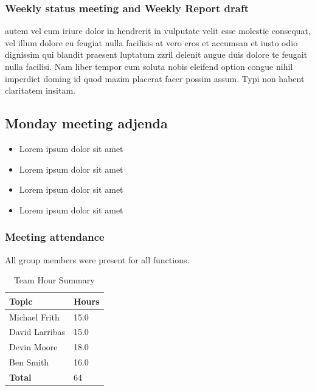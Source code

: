 \documentclass[12pt,journal]{IEEEtran}
\begin{document}
	\subsubsection{Weekly status meeting and Weekly Report draft}
	autem vel eum iriure dolor in hendrerit in vulputate velit esse molestie consequat, vel illum dolore 
	eu feugiat nulla facilisis at vero eros et accumsan et iusto odio dignissim qui blandit praesent luptatum 
	zzril delenit augue duis dolore te feugait nulla facilisi. Nam liber tempor cum soluta nobis eleifend option 
	congue nihil imperdiet doming id quod mazim placerat facer possim assum. Typi non habent claritatem insitam.
		\subsection{Monday meeting adjenda}
		\begin{itemize}
			\item Lorem ipsum dolor sit amet
			\item Lorem ipsum dolor sit amet
			\item Lorem ipsum dolor sit amet
			\item Lorem ipsum dolor sit amet
		\end{itemize}

	\subsubsection{Meeting attendance}
		All group members were present for all functions.

	\begin{table}[H]
		\renewcommand{\arraystretch}{1.3}
		\caption{Team Hour Summary}
		
		\label{Team Hour Summary}
		
		\centering
		\begin{tabular}{p{5cm}|p{1.5cm}}
		\hline
		{\bfseries 	Topic} 								&{\bfseries Hours}		\\
		\hline\hline
					{ Michael Frith}  					& 15.0								\\
					{ David Larribas} 					& 15.0								\\
					{ Devin Moore}							& 18.0								\\
					{ Ben Smith}  							& 16.0								\\		
					\hline
					{\bfseries Total}  					& 64									\\	
					\hline
		\end{tabular}
	\end{table}
\end{document}
